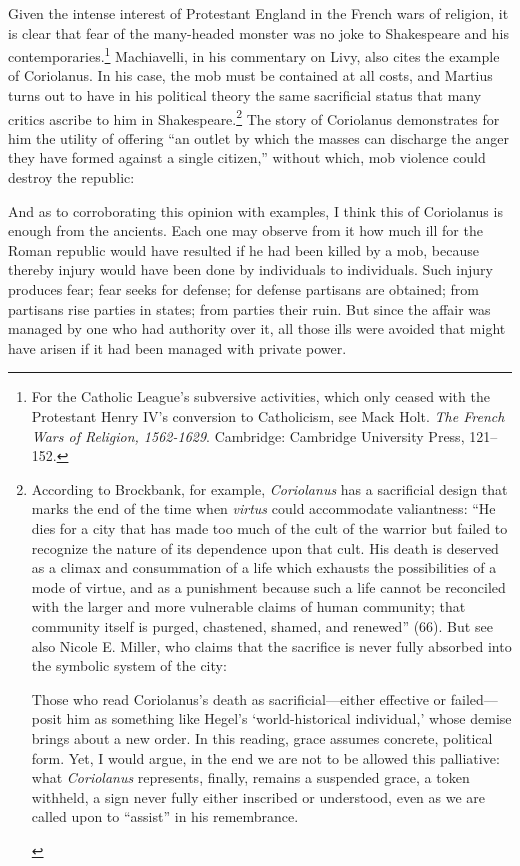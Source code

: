 Given the intense interest of Protestant England in the French wars of religion, it is clear that fear of the many-headed monster was no joke to Shakespeare and his contemporaries.\footnote{For the Catholic League's subversive activities, which only ceased with the Protestant Henry IV's conversion to Catholicism, see Mack Holt. \emph{The French Wars of Religion, 1562-1629}. Cambridge: Cambridge University Press, 121--152. \nocite{holt_french_1995}} 
Machiavelli, in his commentary on Livy, also cites the example of Coriolanus.
In his case, the mob must be contained at all costs, and Martius turns out to have in his political theory the same sacrificial status that many critics ascribe to him in Shakespeare.\footnote{According to Brockbank, for example, \emph{Coriolanus} has a sacrificial design that marks the end of the time when \emph{virtus} could accommodate valiantness: ``He dies for a city that has made too much of the cult of the warrior but failed to recognize the nature of its dependence upon that cult.
His death is deserved as a climax and consummation of a life which exhausts the possibilities of a mode of virtue, and as a punishment because such a life cannot be reconciled with the larger and more vulnerable claims of human community; that community itself is purged, chastened, shamed, and renewed'' (66).
But see also Nicole E. Miller, who claims that the sacrifice is never fully absorbed into the symbolic system of the city:
\begin{bq}
Those who read Coriolanus's death as sacrificial---either effective or failed---posit him as something like Hegel's `world-historical individual,' whose demise brings about a new order.
In this reading, grace assumes concrete, political form.
Yet, I would argue, in the end we are not to be allowed this palliative: what \emph{Coriolanus} represents, finally, remains a suspended grace, a token withheld, a sign never fully either inscribed or understood, even as we are called upon to ``assist'' in his remembrance.~\cite[297]{miller_sacred_2009}
\end{bq}} 
The story of Coriolanus demonstrates for him the utility of offering ``an outlet by which the masses can discharge the anger they have formed against a single citizen,'' without which, mob violence could destroy the republic:
\begin{bq}
And as to corroborating this opinion with examples, I think this of Coriolanus is enough from the ancients.
Each one may observe from it how much ill for the Roman republic would have resulted if he had been killed by a mob, because thereby injury would have been done by individuals to individuals.
Such injury produces fear; fear seeks for defense; for defense partisans are obtained; from partisans rise parties in states; from parties their ruin.
But since the affair was managed by one who had authority over it, all those ills were avoided that might have arisen if it had been managed with private power.~\cite[212--213]{machiavelli_discourses_1989}
\end{bq}
